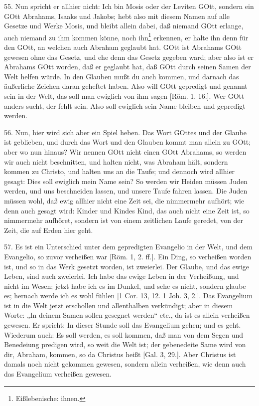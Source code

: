 55. Nun spricht er allhier nicht: Ich bin Mosis oder der Leviten GOtt, sondern ein GOtt Abrahams, Isaaks und Jakobs; hebt also mit diesem Namen auf alle Gesetze und Werke Mosis, und bleibt allein dabei, daß niemand GOtt erlange, auch niemand zu ihm kommen könne, noch ihn\footnote{Eißlebenische: ihnen.} erkennen, er halte ihn denn für den GOtt, an welchen auch Abraham geglaubt hat. GOtt ist Abrahams GOtt gewesen ohne das Gesetz, und ehe denn das Gesetz gegeben ward; aber also ist er Abrahams GOtt worden, daß er geglaubt hat, daß GOtt durch seinen Samen der Welt helfen würde. In den Glauben mußt du auch kommen, und darnach das äußerliche Zeichen daran geheftet haben. Also will GOtt gepredigt und genannt sein in der Welt, das soll man ewiglich von ihm sagen [Röm. 1, 16.]. Wer GOtt anders sucht, der fehlt sein. Also soll ewiglich sein Name bleiben und gepredigt werden.

56. Nun, hier wird sich aber ein Spiel heben. Das Wort GOttes und der Glaube ist geblieben, und durch das Wort und den Glauben kommt man allein zu GOtt; aber wo nun hinaus? Wir nennen GOtt nicht einen GOtt Abrahams, so werden wir auch nicht beschnitten, und halten nicht, was Abraham hält, sondern kommen zu Christo, und halten uns an die Taufe; und dennoch wird allhier gesagt: Dies soll ewiglich mein Name sein? So werden wir Heiden müssen Juden werden, und uns beschneiden lassen, und unsere Taufe fahren lassen. Die Juden müssen wohl, daß ewig allhier nicht eine Zeit sei, die nimmermehr aufhört; wie denn auch gesagt wird: Kinder und Kindes Kind, das auch nicht eine Zeit ist, so nimmermehr aufhöret, sondern ist von einem zeitlichen Laufe geredet, von der Zeit, die auf Erden hier geht.

57. Es ist ein Unterschied unter dem gepredigten Evangelio in der Welt, und dem Evangelio, so zuvor verheißen war [Röm. 1, 2. ff.]. Ein Ding, so verheißen worden ist, und so in das Werk gesetzt worden, ist zweierlei. Der Glaube, und das ewige Leben, sind auch zweierlei. Ich habe das ewige Leben in der Verheißung, und nicht im Wesen; jetzt habe ich es im Dunkel, und sehe es nicht, sondern glaube es; hernach werde ich es wohl fühlen [1 Cor. 13, 12. 1 Joh. 3, 2.]. Das Evangelium ist in die Welt jetzt erschollen und allenthalben verkündigt; aber in diesem Worte: „In deinem Samen sollen gesegnet werden“ etc., da ist es allein verheißen gewesen. Er spricht: In dieser Stunde soll das Evangelium gehen; und es geht. Wiederum auch: Es soll werden, es soll kommen, daß man von dem Segen und Benedeiung predigen wird, so weit die Welt ist; der gebenedeite Same wird von dir, Abraham, kommen, so da Christus heißt [Gal. 3, 29.]. Aber Christus ist damals noch nicht gekommen gewesen, sondern allein verheißen, wie denn auch das Evangelium verheißen gewesen.

